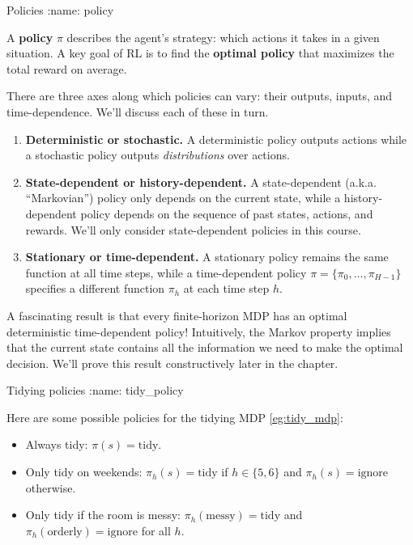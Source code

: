 \documentclass[\main/main]{subfiles}
\begin{document}
\begin{definition}{Policies}
:name: policy

    A \textbf{policy} $\pi$ describes the agent's strategy: which actions it takes in a given situation. A key goal of RL is to find the \textbf{optimal policy} that maximizes the total reward on average.

    There are three axes along which policies can vary: their outputs, inputs, and time-dependence. We'll discuss each of these in turn.

    \begin{enumerate}
        \item \textbf{Deterministic or stochastic.} A deterministic policy outputs actions while a stochastic policy outputs \emph{distributions} over actions.
        \item \textbf{State-dependent or history-dependent.} A state-dependent (a.k.a. ``Markovian'') policy only depends on the current state, while a history-dependent policy depends on the sequence of past states, actions, and rewards. We'll only consider state-dependent policies in this course.
        \item \textbf{Stationary or time-dependent.} A stationary policy remains the same function at all time steps, while a time-dependent policy $\pi = \{ \pi_0, \dots, \pi_{H-1} \}$ specifies a different function $\pi_h$ at each time step $h$.
    \end{enumerate}
\end{definition}

A fascinating result is that every finite-horizon MDP has an optimal deterministic time-dependent policy! Intuitively, the Markov property implies that the current state contains all the information we need to make the optimal decision. We'll prove this result constructively later in the chapter.


\begin{example}{Tidying policies}
:name: tidy_policy

    Here are some possible policies for the tidying MDP \eqref{eg:tidy_mdp}:

    \begin{itemize}
        \item Always tidy: $\pi(s) = \text{tidy}$.
        \item Only tidy on weekends: $\pi_h(s) = \text{tidy}$ if $h \in \{ 5, 6 \}$ and $\pi_h(s) = \text{ignore}$ otherwise.
        \item Only tidy if the room is messy: $\pi_h(\text{messy}) = \text{tidy}$ and $\pi_h(\text{orderly}) = \text{ignore}$ for all $h$.
    \end{itemize}
\end{example}
\end{document}
